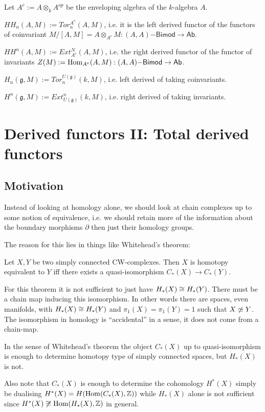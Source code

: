 \documentclass[fontsize=11pt,fleqn,a4paper]{scrartcl}
\begin{document}
\begin{example}
Let $A^e := A\otimes_k A^{op}$ be the enveloping algebra of the $k$-algebra $A$.

$HH_n(A,M) := Tor_n^{A^e}(A,M)$, i.e. it is the left derived functor of the functors of coinvariant $M/[A,M] = A\otimes_{A^e} M: (A,A)\mathsf{-Bimod} \to \mathsf{Ab}$.

$HH^n(A,M) := Ext_{A^e}^N(A,M)$, i.e. the right derived functor of the functor of invariants $Z(M) := \operatorname{Hom}_{A^e}(A,M): (A,A)\mathsf{-Bimod} \to \mathsf{Ab}$.
\end{example}

\begin{example}
$H_n(\mathfrak{g},M) := Tor_n^{U(\mathfrak{g})}(k,M)$, i.e. left derived of taking coinvariants.

$H^n(\mathfrak{g},M) := Ext^n_{U(\mathfrak{g})}(k,M)$, i.e. right derived of taking invariants.
\end{example}

\section{Derived functors II: Total derived functors}

\subsection{Motivation}

\begin{remark}
Instead of looking at homology alone, we should look at chain complexes up to some notion of equivalence, i.e. we should retain more of the information about the boundary morphisms $\partial$ then just their homology groups.

The reason for this lies in things like Whitehead's theorem:

\begin{theorem}
Let $X,Y$ be two simply connected CW-complexes. Then $X$ is homotopy equivalent to $Y$ iff there exists a quasi-isomorphism $C_\ast(X) \to C_\ast(Y)$.
\end{theorem}

For this theorem it is not sufficient to just have $H_\ast(X) \cong H_\ast(Y)$. There must be a chain map inducing this isomorphism. In other words there are spaces, even manifolds, with $H_\ast(X)\cong H_\ast(Y)$ and $\pi_1(X) = \pi_1(Y) = 1$ such that $X \not \overset{}{\simeq} Y$. The isomorphism in homology is \enquote{accidental} in a sense, it does not come from a chain-map.

In the sense of Whitehead's theorem the object $C_\ast(X)$ up to quasi-isomorphism is enough to determine homotopy type of simply connected spaces, but $H_\ast(X)$ is not.

Also note that $C_\ast(X)$ is enough to determine the cohomology $H^\ast(X)$ simply be dualising $H^\ast(X) = H(\operatorname{Hom}(C_\ast(X),\mathbb{Z}))$ while $H_\ast(X)$ alone is not sufficient since $H^\ast(X) \not\cong \operatorname{Hom}(H_\ast(X),\mathbb{Z})$ in general.
\end{remark}
\end{document}
